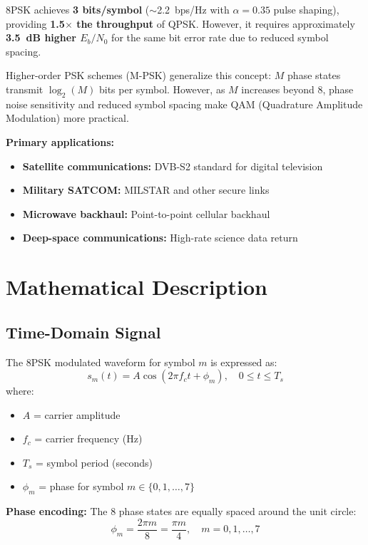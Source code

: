 \begin{keyconcept}
8PSK achieves \textbf{3 bits/symbol} ($\sim$2.2~bps/Hz with $\alpha = 0.35$ pulse shaping), providing \textbf{1.5$\times$ the throughput} of QPSK. However, it requires approximately \textbf{3.5~dB higher $E_b/N_0$} for the same bit error rate due to reduced symbol spacing.
\end{keyconcept}

Higher-order PSK schemes (M-PSK) generalize this concept: $M$ phase states transmit $\log_2(M)$ bits per symbol. However, as $M$ increases beyond 8, phase noise sensitivity and reduced symbol spacing make QAM (Quadrature Amplitude Modulation) more practical.

\textbf{Primary applications:}
\begin{itemize}
\item \textbf{Satellite communications:} DVB-S2 standard for digital television
\item \textbf{Military SATCOM:} MILSTAR and other secure links
\item \textbf{Microwave backhaul:} Point-to-point cellular backhaul
\item \textbf{Deep-space communications:} High-rate science data return
\end{itemize}

\section{Mathematical Description}

\subsection{Time-Domain Signal}

The 8PSK modulated waveform for symbol $m$ is expressed as:
\begin{equation}
s_m(t) = A\cos(2\pi f_c t + \phi_m), \quad 0 \leq t \leq T_s
\end{equation}
where:
\begin{itemize}
\item $A$ = carrier amplitude
\item $f_c$ = carrier frequency (Hz)
\item $T_s$ = symbol period (seconds)
\item $\phi_m$ = phase for symbol $m \in \{0, 1, \ldots, 7\}$
\end{itemize}

\textbf{Phase encoding:} The 8 phase states are equally spaced around the unit circle:
\begin{equation}
\phi_m = \frac{2\pi m}{8} = \frac{\pi m}{4}, \quad m = 0, 1, \ldots, 7
\end{equation}

